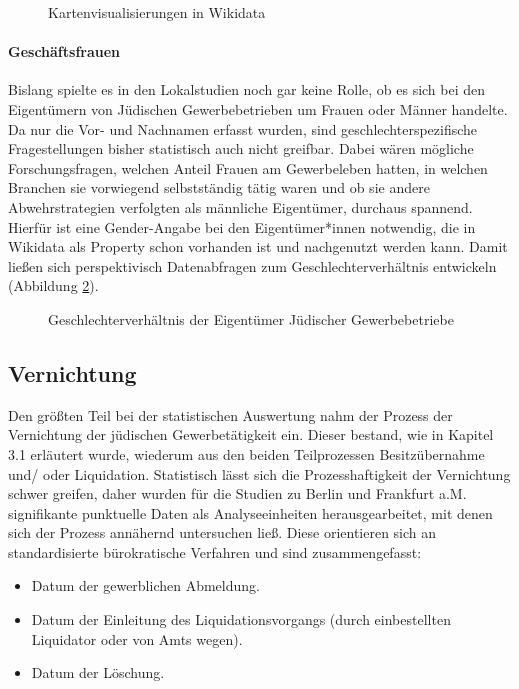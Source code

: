 \begin{figure}[h]
    \centering
    \caption{Kartenvisualisierungen in Wikidata}
    \label{fig:wikidatamap}
\end{figure}

\paragraph{Geschäftsfrauen}
Bislang spielte es in den Lokalstudien noch gar keine Rolle, ob es sich bei den Eigentümern von Jüdischen Gewerbebetrieben um Frauen oder Männer handelte. Da nur die Vor- und Nachnamen erfasst wurden, sind geschlechterspezifische Fragestellungen bisher statistisch auch nicht greifbar. Dabei wären mögliche Forschungsfragen, welchen Anteil Frauen am Gewerbeleben hatten, in welchen Branchen sie vorwiegend selbstständig tätig waren und ob sie andere Abwehrstrategien verfolgten als männliche Eigentümer, durchaus spannend. Hierfür ist eine Gender-Angabe bei den Eigentümer*innen notwendig, die in Wikidata als Property schon vorhanden ist und nachgenutzt werden kann. Damit ließen sich perspektivisch Datenabfragen zum Geschlechterverhältnis entwickeln (Abbildung \ref{fig:wikidatagender}). 

\begin{figure}[h]
    \centering
    \caption{Geschlechterverhältnis der Eigentümer Jüdischer Gewerbebetriebe}
    \label{fig:wikidatagender}
\end{figure}

\subsection{Vernichtung}

Den größten Teil bei der statistischen Auswertung nahm der Prozess der Vernichtung der jüdischen Gewerbetätigkeit ein. Dieser bestand, wie in Kapitel 3.1 erläutert wurde, wiederum aus den beiden Teilprozessen Besitzübernahme und/ oder Liquidation. Statistisch lässt sich die Prozesshaftigkeit der Vernichtung schwer greifen, daher wurden für die Studien zu Berlin und Frankfurt a.M. signifikante punktuelle Daten als Analyseeinheiten herausgearbeitet, mit denen sich der Prozess annähernd untersuchen ließ. Diese orientieren sich an standardisierte bürokratische Verfahren und sind zusammengefasst:

\begin{itemize}
    \item Datum der gewerblichen Abmeldung.
    \item Datum der Einleitung des Liquidationsvorgangs (durch einbestellten Liquidator oder von Amts wegen).
    \item Datum der Löschung.
\end{itemize}

